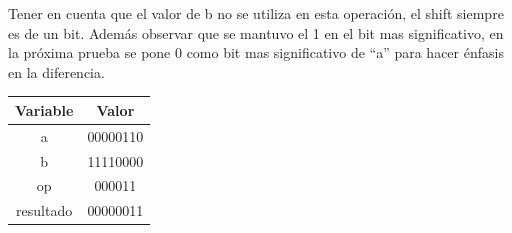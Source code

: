 \documentclass[letterpaper]{sae}
\begin{document}
\begin{figure}[H] %
\label{fig:test7}
\end{figure}

Tener en cuenta que el valor de b no se utiliza en esta operación, el shift siempre es de un bit. Además observar que se mantuvo el 1 en el bit mas significativo, en la próxima prueba se pone 0 como bit mas significativo de “a” para hacer énfasis en la diferencia.

\begin{center}
	\begin{tabular}{|c|c|}
		\hline 
		Variable & Valor\tabularnewline
		\hline 
		\hline 
		a & 00000110\tabularnewline
		\hline 
		b & 11110000\tabularnewline
		\hline 
		op & 000011\tabularnewline
		\hline 
		resultado & 00000011\tabularnewline
		\hline 
	\end{tabular}
\end{center}
\end{document}
